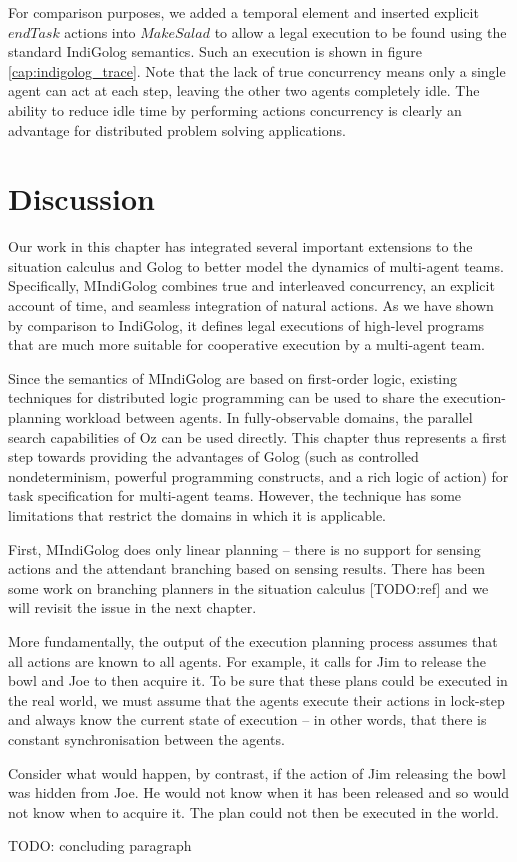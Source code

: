 For comparison purposes, we added a temporal element and inserted
explicit $endTask$ actions into $MakeSalad$ to allow a legal execution
to be found using the standard IndiGolog semantics. Such an execution
is shown in figure \ref{cap:indigolog_trace}. Note that the lack
of true concurrency means only a single agent can act at each step,
leaving the other two agents completely idle. The ability to reduce
idle time by performing actions concurrency is clearly an advantage
for distributed problem solving applications.


\section{Discussion\label{sec:MIndiGolog:Discussion}}

Our work in this chapter has integrated several important extensions
to the situation calculus and Golog to better model the dynamics of
multi-agent teams. Specifically, MIndiGolog combines true and interleaved
concurrency, an explicit account of time, and seamless integration
of natural actions. As we have shown by comparison to IndiGolog, it
defines legal executions of high-level programs that are much more
suitable for cooperative execution by a multi-agent team.

Since the semantics of MIndiGolog are based on first-order logic,
existing techniques for distributed logic programming can be used
to share the execution-planning workload between agents. In fully-observable
domains, the parallel search capabilities of Oz can be used directly.
This chapter thus represents a first step towards providing the advantages
of Golog (such as controlled nondeterminism, powerful programming
constructs, and a rich logic of action) for task specification for
multi-agent teams. However, the technique has some limitations that
restrict the domains in which it is applicable.

First, MIndiGolog does only linear planning -- there is no support
for sensing actions and the attendant branching based on sensing results.
There has been some work on branching planners in the situation calculus
{[}TODO:ref] and we will revisit the issue in the next chapter.

More fundamentally, the output of the execution planning process assumes
that all actions are known to all agents. For example, it calls for
Jim to release the bowl and Joe to then acquire it. To be sure that
these plans could be executed in the real world, we must assume that
the agents execute their actions in lock-step and always know the
current state of execution -- in other words, that there is constant
synchronisation between the agents.

Consider what would happen, by contrast, if the action of Jim releasing
the bowl was hidden from Joe. He would not know when it has been released
and so would not know when to acquire it. The plan could not then
be executed in the world.

TODO: concluding paragraph

